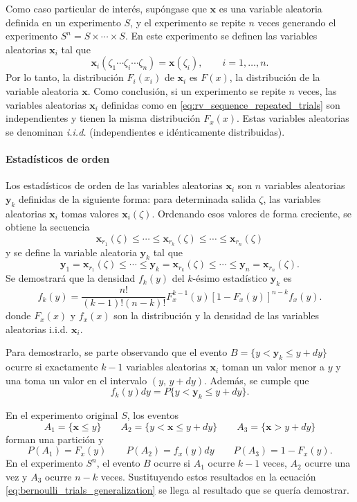 \documentclass[a4paper]{report}
\newcommand{\x}{\mathbf{x}}
\newcommand{\y}{\mathbf{y}}
\begin{document}
Como caso particular de interés, supóngase que \(\x\) es una variable aleatoria definida en un experimento \(S\), y el experimento se repite \(n\) veces generando el experimento \(S^n=S\times\cdots\times S\). En este experimento se definen las variables aleatorias \(\x_i\) tal que
\begin{equation}\label{eq:rv_sequence_repeated_trials}
 \x_i(\zeta_1\cdots\zeta_i\cdots\zeta_n)=\x(\zeta_i),\qquad i=1,\dots,n.
\end{equation}
Por lo tanto, la distribución \(F_i(x_i)\) de \(\x_i\) es \(F(x)\), la distribución de la variable aleatoria \(\x\). Como conclusión, si un experimento se repite \(n\) veces, las variables aleatorias \(\x_i\) definidas como en \ref{eq:rv_sequence_repeated_trials} son independientes y tienen la misma distribución \(F_x(x)\). Estas variables aleatorias se denominan \emph{i.i.d.} (independientes e idénticamente distribuidas).

\paragraph{Estadísticos de orden}

Los estadísticos de orden de las variables aleatorias \(\x_i\) son \(n\) variables aleatorias \(\y_k\) definidas de la siguiente forma: para determinada salida \(\zeta\), las variables aleatorias \(\x_i\) tomas valores \(\x_i(\zeta)\). Ordenando esos valores de forma creciente, se obtiene la secuencia
\[
 \x_{r_1}(\zeta)\leq\cdots\leq\x_{r_k}(\zeta)\leq\cdots\leq\x_{r_n}(\zeta) 
\]
y se define la variable aleatoria \(\y_k\) tal que
\[
 \y_1=\x_{r_1}(\zeta)\leq\cdots\leq\y_k=\x_{r_k}(\zeta)\leq\cdots\leq\y_n=\x_{r_n}(\zeta).
\]
Se demostrará que la densidad \(f_k(y)\) del \(k\)-ésimo estadístico \(\y_k\) es
\begin{equation}\label{eq:ordered_statistic_density}
 f_k(y)=\frac{n!}{(k-1)!(n-k)!}F_x^{k-1}(y)[1-F_x(y)]^{n-k}f_x(y).
\end{equation}
donde \(F_x(x)\) y \(f_x(x)\) son la distribución y la densidad de las variables aleatorias i.i.d. \(\x_i\).

Para demostrarlo, se parte observando que el evento \(B=\{y<\y_k\leq y+dy\}\) ocurre si exactamente \(k-1\) variables aleatorias \(\x_i\) toman un valor menor a \(y\) y una toma un valor en el intervalo \((y,\,y+dy)\).
Además, se cumple que 
\[
 f_k(y)dy=P\{y<\y_k\leq y+dy\}.
\]

En el experimento original \(S\), los eventos
\[
 A_1=\{\x\leq y\}\qquad A_2=\{y<\x\leq y+dy\}\qquad A_3=\{\x>y+dy\}
\]
forman una partición y
\[
 P(A_1)=F_x(y)\qquad P(A_2)=f_x(y)dy\qquad P(A_3)=1-F_x(y).
\]
En el experimento \(S^n\), el evento \(B\) ocurre si \(A_1\) ocurre \(k-1\) veces, \(A_2\) ocurre una vez y \(A_3\) ocurre \(n-k\) veces. Sustituyendo estos resultados en la ecuación \ref{eq:bernoulli_trials_generalization} se llega al resultado que se quería demostrar.
\end{document}
